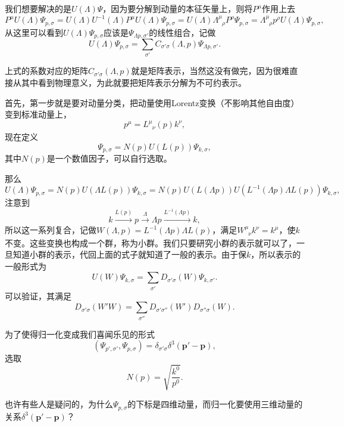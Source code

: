 我们想要解决的是$U(\Lambda)\Psi$，因为要分解到动量的本征矢量上，则将$P^\mu$作用上去
\[
P^\mu U(\Lambda)\Psi_{p,\sigma}=U(\Lambda)U^{-1}(\Lambda)P^\mu U(\Lambda)\Psi_{p,\sigma}=U(\Lambda)\Lambda^\mu_{\phantom{\mu}\rho}P^\rho\Psi_{p,\sigma}=\Lambda^\mu_{\phantom{\mu}\rho}p^\rho U(\Lambda)\Psi_{p,\sigma},
\]
从这里可以看到$U(\Lambda)\Psi_{p,\sigma}$应该是$\Psi_{\Lambda p,\sigma'}$的线性组合，记做
\[
U(\Lambda)\Psi_{p,\sigma}=\sum_{\sigma'}C_{\sigma'\sigma}(\Lambda,p)\Psi_{\Lambda p,\sigma'}.
\]

上式的系数对应的矩阵$C_{\sigma'\sigma}(\Lambda,p)$就是矩阵表示，当然这没有做完，因为很难直接从其中看到物理意义，为此就要把矩阵表示分解为不可约表示。

首先，第一步就是要对动量分类，把动量使用Lorentz变换（不影响其他自由度）变到标准动量上，
\[
p^\mu=L^\mu_{\phantom{\mu}\nu}(p)k^\nu,
\]
现在定义
\[
\Psi_{p,\sigma}=N(p)U(L(p))\Psi_{k,\sigma},
\]
其中$N(p)$是一个数值因子，可以自行选取。

那么
\[
U(\Lambda)\Psi_{p,\sigma}=N(p)U(\Lambda L(p))\Psi_{k,\sigma}=N(p)U(L(\Lambda p))U(L^{-1}(\Lambda p)\Lambda L(p))\Psi_{k,\sigma},
\]
注意到
\[
k\xrightarrow{L(p)}p\xrightarrow{\Lambda}\Lambda p \xrightarrow{L^{-1}(\Lambda p)}k,
\]
所以这一系列复合，记做$W(\Lambda,p)=L^{-1}(\Lambda p)\Lambda L(p)$，满足$W^\mu_{\phantom{\mu}\nu}k^\nu=k^\mu$，使$k$不变。这些变换也构成一个群，称为小群。我们只要研究小群的表示就可以了，一旦知道小群的表示，代回上面的式子就知道了一般的表示。由于保$k$，所以表示的一般形式为
\[
U(W)\Psi_{k,\sigma}=\sum_{\sigma'}D_{\sigma'\sigma}(W)\Psi_{k,\sigma'}.
\]
可以验证，其满足
\[
D_{\sigma'\sigma}(W'W)=\sum_{\sigma''}D_{\sigma'\sigma''}(W')D_{\sigma''\sigma}(W).
\]

为了使得归一化变成我们喜闻乐见的形式
\[
(\Psi_{p',\sigma'},\Psi_{p,\sigma})=\delta_{\sigma'\sigma}\delta^3(\bm{p}'-\bm{p}),
\]
选取
\[
N(p)=\sqrt{\frac{k^0}{p^0}}.
\]

也许有些人是疑问的，为什么$\Psi_{p,\sigma}$的下标是四维动量，而归一化要使用三维动量的关系$\delta^3(\bm{p}'-\bm{p})$？


